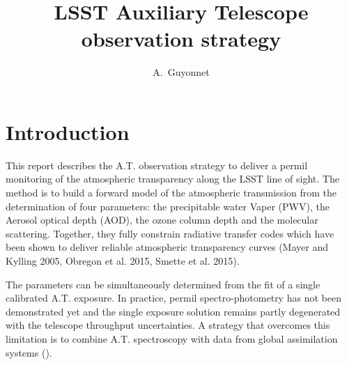 \documentclass[onecolumn]{aa}
\begin{document}
\title{LSST Auxiliary Telescope observation strategy}

\author{
A.~Guyonnet
}






\maketitle


\tableofcontents



\section*{Introduction}

This report describes the A.T. observation strategy to deliver a permil monitoring of the atmospheric transparency along the LSST line of sight. The method is to build a forward model of the atmospheric transmission from the determination of four parameters: the precipitable water Vaper (PWV), the Aerosol optical depth (AOD), the ozone column depth and the molecular scattering. Together, they fully constrain radiative transfer codes which have been shown to deliver reliable atmospheric transparency curves (Mayer and Kylling 2005, Obregon et al. 2015, Smette et al. 2015). 


The parameters can be simultaneously determined from the fit of a single calibrated A.T. exposure. In practice, permil spectro-photometry has not been demonstrated yet and the single exposure solution remains partly degenerated with the telescope throughput uncertainties. A strategy that overcomes this limitation is to combine A.T. spectroscopy with data from global assimilation systems (\citealt{coughlin}). 
\end{document}
